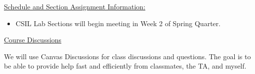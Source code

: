 %  
%  
%
%  
%
\noindent \underline{Schedule and Section Assignment Information:}

  \begin{itemize}

    \item CSIL Lab Sections will begin meeting in Week 2 of Spring Quarter. 

  \end{itemize}
  


\noindent \underline{Course Discussions}

\noindent We will use Canvas Discussions for class discussions and questions. The goal is to be able to provide help fast and efficiently from classmates, the TA, and myself. 

